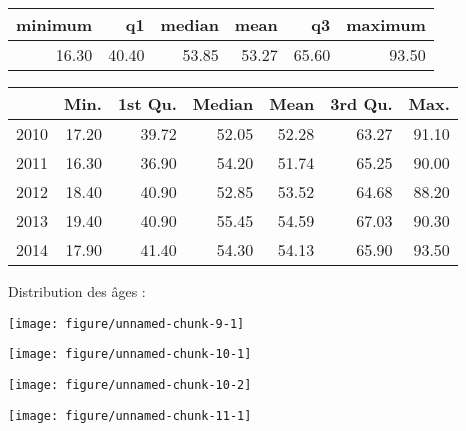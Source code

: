 \documentclass[11pt,a4paper]{article}\usepackage[]{graphicx}\usepackage[]{color}
\makeatletter
\def\maxwidth{ %
  \ifdim\Gin@nat@width>\linewidth
    \linewidth
  \else
    \Gin@nat@width
  \fi
}
\newenvironment{knitrout}{}{} %
\makeatother
\begin{document}
\begin{table}[ht]
\centering
\begin{tabular}{rrrrrr}
  \hline
minimum & q1 & median & mean & q3 & maximum \\ 
  \hline
16.30 & 40.40 & 53.85 & 53.27 & 65.60 & 93.50 \\ 
   \hline
\end{tabular}
\end{table}
\begin{table}[H]
\centering
\begin{tabular}{rrrrrrr}
  \hline
 & Min. & 1st Qu. & Median & Mean & 3rd Qu. & Max. \\ 
  \hline
2010 & 17.20 & 39.72 & 52.05 & 52.28 & 63.27 & 91.10 \\ 
  2011 & 16.30 & 36.90 & 54.20 & 51.74 & 65.25 & 90.00 \\ 
  2012 & 18.40 & 40.90 & 52.85 & 53.52 & 64.68 & 88.20 \\ 
  2013 & 19.40 & 40.90 & 55.45 & 54.59 & 67.03 & 90.30 \\ 
  2014 & 17.90 & 41.40 & 54.30 & 54.13 & 65.90 & 93.50 \\ 
   \hline
\end{tabular}
\end{table}


Distribution des âges :

\begin{knitrout}
\color{fgcolor}
\texttt{[image: figure/unnamed-chunk-9-1]} 

\end{knitrout}

\begin{knitrout}
\color{fgcolor}
\texttt{[image: figure/unnamed-chunk-10-1]} 

\texttt{[image: figure/unnamed-chunk-10-2]} 

\end{knitrout}

\begin{knitrout}
\color{fgcolor}
\texttt{[image: figure/unnamed-chunk-11-1]} 

\end{knitrout}
\end{document}
